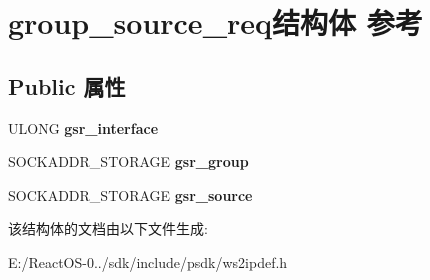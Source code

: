 \hypertarget{structgroup__source__req}{}\section{group\+\_\+source\+\_\+req结构体 参考}
\label{structgroup__source__req}
\subsection*{Public 属性}
\begin{DoxyCompactItemize}
\item 
\mbox{\label{structgroup__source__req_afc323c183497821b3f0d54efda130f3c}} 
U\+L\+O\+NG {\bfseries gsr\+\_\+interface}
\item 
\mbox{\label{structgroup__source__req_a5922d98d3fbf7545684dabdf9a2a001f}} 
S\+O\+C\+K\+A\+D\+D\+R\+\_\+\+S\+T\+O\+R\+A\+GE {\bfseries gsr\+\_\+group}
\item 
\mbox{\label{structgroup__source__req_a69275cd31a549b2b113329796e8be44b}} 
S\+O\+C\+K\+A\+D\+D\+R\+\_\+\+S\+T\+O\+R\+A\+GE {\bfseries gsr\+\_\+source}
\end{DoxyCompactItemize}


该结构体的文档由以下文件生成\+:\begin{DoxyCompactItemize}
\item 
E\+:/\+React\+O\+S-\/0../sdk/include/psdk/ws2ipdef.\+h\end{DoxyCompactItemize}
